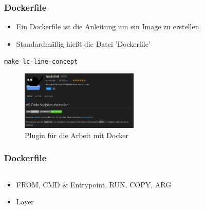 \documentclass[22pt,handout]{beamer}
\begin{document}

\begin{frame}[t]
    \frametitle{Dockerfile}
    \begin{itemize}
        \item Ein Dockerfile ist die Anleitung um ein Image zu erstellen.
        \item Standardmäßig hießt die Datei 'Dockerfile'
    \end{itemize}

    \verb|make lc-line-concept|
    
    \begin{figure}[h]
        \centering
        \includegraphics[width=0.5\textwidth]{Bilder/Hadolint.png}
        \caption{Plugin für die Arbeit mit Docker}
    \end{figure}

\end{frame}

\begin{frame}[t]
    \frametitle{Dockerfile}
    \inputminted[fontsize=\footnotesize, frame=lines]{dockerfile}{../examples/Dockerfile}
    \begin{itemize}
        \item FROM, CMD \& Entrypoint, RUN, COPY, ARG
        \item Layer %
    \end{itemize} 
\end{frame}
\end{document}
